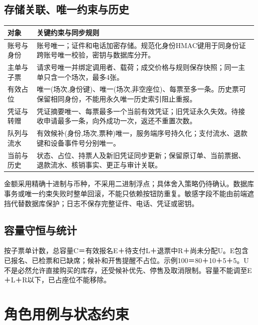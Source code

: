 \documentclass[UTF8,zihao=-4,fontset=windows]{ctexart}
\begin{document}
\subsection{存储关联、唯一约束与历史}
\begin{small}
\noindent\begin{tabularx}{\linewidth}{p{27mm}X}
\toprule
对象 & 关键约束与同步规则 \\ \midrule
账号与身份 & 账号唯一；证件和电话加密存储。规范化身份HMAC键用于同身份证跨账号唯一校验，密钥与数据库分开。 \\
主单与子票 & 请求号唯一并绑定调用者、载荷；成交价格与规则保存快照；同一主单只含一个场次，最多4张。 \\
有效占位 & 唯一(场次,身份键)、唯一(场次,非空座位)、每票至多一条。历史票可保留相同身份，不能用永久唯一历史索引阻止重报。 \\
凭证与转赠 & 凭证摘要唯一、每票最多一个当前有效凭证；旧凭证永久失效。待接收申请最多一条，向外成功一次，返还不重置次数。 \\
队列与流水 & 有效候补(身份,场次,票种)唯一，服务端序号持久化；支付流水、退款键和设备事件号分别唯一。 \\
当前与历史 & 状态、占位、持票人及新旧凭证同步更新；保留原订单、当前票据、退款流水、核销事实、更正与审计关联。 \\
\bottomrule
\end{tabularx}
\end{small}\par\smallskip
金额采用精确十进制与币种，不采用二进制浮点；具体舍入策略仍待确认。数据库事务或唯一约束失败时整单回滚，不能只依赖按钮防重复。敏感字段不能由前端遮挡代替数据库保护；日志不保存完整证件、电话、凭证或密钥。


\subsection{容量守恒与统计}
按子票单计数，总容量C＝有效报名E＋待支付L＋退票中R＋尚未分配U。E包含已报名、已检票和已缺席；候补和开售提醒不占位。示例100＝80＋10＋5＋5。U不是必然允许直接购买的库存，还受候补优先、停售及取消限制。容量不能调至E＋L＋R以下，已占座位不能移除。


\clearpage

\section{角色用例与状态约束}
\end{document}
